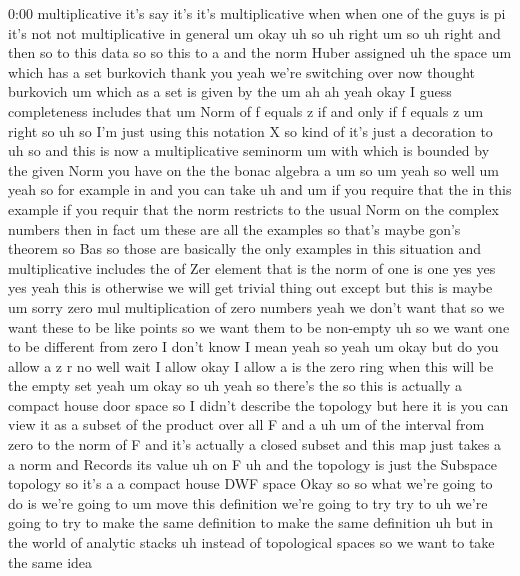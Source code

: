 \begin{unfinished}{0:00}
multiplicative  it's  say  it's  it's
multiplicative  when  when  one  of  the  guys
is  pi  it's  not  not  multiplicative  in
general
um  okay
uh  so  uh
right
um  so  uh  right  and  then  so  to  this  data
so  so  this  to  a  and  the  norm  Huber
assigned  uh  the  space
um  which  has  a
set  burkovich  thank  you  yeah  we're
switching  over  now  thought  burkovich
um  which  as  a  set  is  given  by  the
um  ah  ah  yeah  okay  I  guess  completeness
includes  that  um  Norm  of  f  equals  z  if
and  only  if  f  equals  z  um  right
so
uh  so  I'm  just  using  this  notation  X  so
kind  of  it's  just  a  decoration  to  uh  so
and  this  is  now  a  multiplicative
seminorm  um
with  which  is  bounded  by  the  given  Norm
you  have  on  the  the  bonac  algebra  a
um  so  um  yeah
so
well  um  yeah  so  for  example
in  and  you  can
take
uh
and  um  if
you  require  that  the  in  this  example  if
you  requir  that  the  norm  restricts  to
the  usual  Norm  on  the  complex  numbers
then  in  fact  um  these  are  all  the
examples  so  that's  maybe  gon's  theorem
so  Bas  so  those  are  basically  the  only
examples  in  this  situation  and
multiplicative  includes  the  of  Zer
element  that  is  the  norm  of  one  is
one  yes  yes  yes
yeah  this  is  otherwise  we  will  get
trivial  thing  out
except  but  this  is
maybe
um  sorry  zero  mul  multiplication  of  zero
numbers  yeah  we  don't  want  that  so  we
want  these  to  be  like  points  so  we  want
them  to  be  non-empty  uh  so  we  want  one
to  be  different  from  zero  I  don't  know  I
mean  yeah  so
yeah  um  okay
but  do  you  allow  a  z  r  no  well  wait  I
allow  okay  I  allow  a  is  the  zero  ring
when  this  will  be  the  empty  set
yeah  um  okay  so  uh  yeah  so  there's  the
so  this  is  actually  a  compact  house  door
space  so  I  didn't  describe  the  topology
but  here  it
is  you  can  view  it  as  a  subset  of  the
product  over  all  F  and  a
uh  um  of  the  interval  from  zero  to  the
norm  of
F  and  it's  actually  a  closed
subset  and  this  map  just  takes  a  a  norm
and  Records  its  value  uh  on
F  uh  and  the  topology  is  just  the
Subspace  topology  so  it's  a  a  compact
house  DWF
space
Okay
so
so  what  we're  going  to  do  is  we're  going
to
um  move  this  definition  we're  going  to
try  try  to  uh  we're  going  to  try  to  make
the  same
definition  to  make  the  same
definition  uh  but  in  the  world  of
analytic  stacks
uh  instead  of  topological
spaces  so  we  want  to  take  the  same  idea

\end{unfinished}
